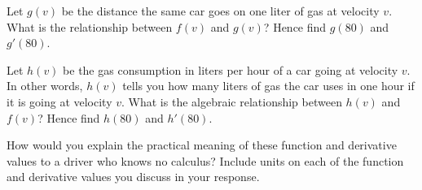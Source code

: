 \begin{exercises}
\ba
	\item Let $g(v)$ be the distance the same car goes on one liter of gas at velocity $v$.  What is the relationship between $f(v)$ and $g(v)$? Hence find $g(80)$ and $g'(80)$.
      	\item Let $h(v)$ be the gas consumption in liters per hour of a car going at velocity $v$. In other words, $h(v)$ tells you how many liters of gas the car uses in one hour if it is going at velocity $v$.   What is the algebraic relationship between $h(v)$ and $f(v)$?  Hence find $h(80)$ and $h'(80)$.     
	\item How would you explain the practical meaning of these function and derivative values to a driver who knows no calculus?  Include units on each of the function and derivative values you discuss in your response.  
\ea
\end{exercises}
\afterexercises